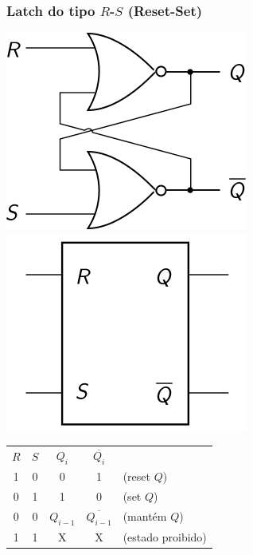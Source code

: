 \documentclass{beamer}
\newcommand{\Not}[1]{\overline{#1}}
\begin{document}
\begin{frame}
\frametitle{Latch do tipo $R$-$S$ (Reset-Set)}

\centering
\includegraphics{images/latchRS_circuit}
\hspace{6ex}
\raisebox{40pt}{\Huge$=$}
\hspace{6ex}
\includegraphics{images/latchRS_blackbox}\\

\vspace{12pt}

\begin{center}
\begin{tabular}{cc||ccl}
$R$ & $S$ & $Q_i$ & $\Not{Q_i}$ \\
\cline{1-4}
 1  &  0  &   0   &     1       & (reset $Q$) \\
 0  &  1  &   1   &     0       & (set $Q$) \\
 0  &  0  & $Q_{i-1}$ & $\Not{Q_{i-1}}$ & (mantém $Q$) \\
 1  &  1  &   X   &     X       & (estado proibido)
\end{tabular}
\end{center}
\end{frame}
\end{document}

